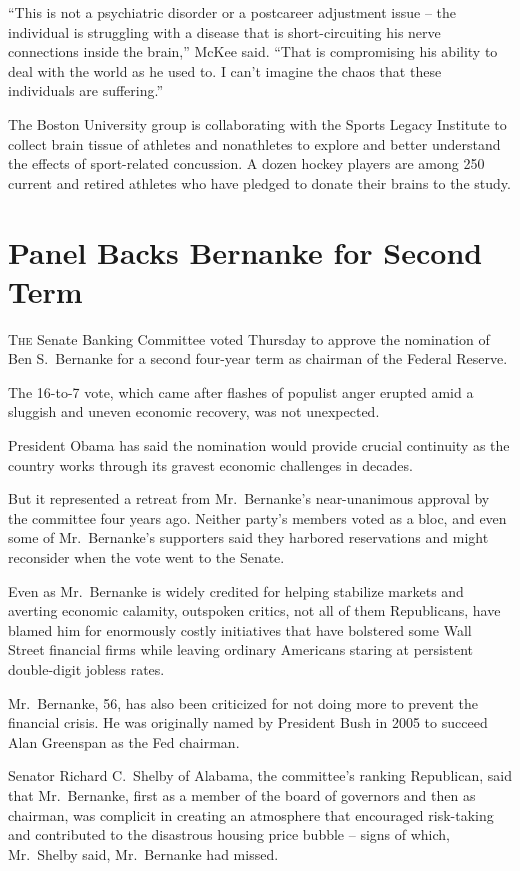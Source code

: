 ﻿\documentclass[12pt]{article}
\begin{document}
``This is not a psychiatric disorder or a postcareer adjustment issue -- the individual is
struggling with a disease that is short-circuiting his nerve connections inside the brain,'' McKee
said. ``That is compromising his ability to deal with the world as he used to. I can't imagine the
chaos that these individuals are suffering.''

The Boston University group is collaborating with the Sports Legacy Institute to collect brain
tissue of athletes and nonathletes to explore and better understand the effects of sport-related
concussion. A dozen hockey players are among 250 current and retired athletes who have pledged to
donate their brains to the study.

\section{Panel Backs Bernanke for Second Term}

\lettrine{T}{he} Senate Banking Committee voted Thursday to approve the
nomination of Ben S.~Bernanke for a second four-year term as chairman of the Federal Reserve.

The 16-to-7 vote, which came after flashes of populist anger erupted amid a sluggish and uneven
economic recovery, was not unexpected.

President Obama has said the nomination would provide crucial continuity as the country works
through its gravest economic challenges in decades.

But it represented a retreat from Mr.~Bernanke's near-unanimous approval by the committee four years
ago. Neither party's members voted as a bloc, and even some of Mr.~Bernanke's supporters said they
harbored reservations and might reconsider when the vote went to the Senate.

Even as Mr.~Bernanke is widely credited for helping stabilize markets and averting economic
calamity, outspoken critics, not all of them Republicans, have blamed him for enormously costly
initiatives that have bolstered some Wall Street financial firms while leaving ordinary Americans
staring at persistent double-digit jobless rates.

Mr.~Bernanke, 56, has also been criticized for not doing more to prevent the financial crisis. He
was originally named by President Bush in 2005 to succeed Alan Greenspan as the Fed chairman.

Senator Richard C.~Shelby of Alabama, the committee's ranking Republican, said that Mr.~Bernanke,
first as a member of the board of governors and then as chairman, was complicit in creating an
atmosphere that encouraged risk-taking and contributed to the disastrous housing price bubble --
signs of which, Mr.~Shelby said, Mr.~Bernanke had missed.
\end{document}
